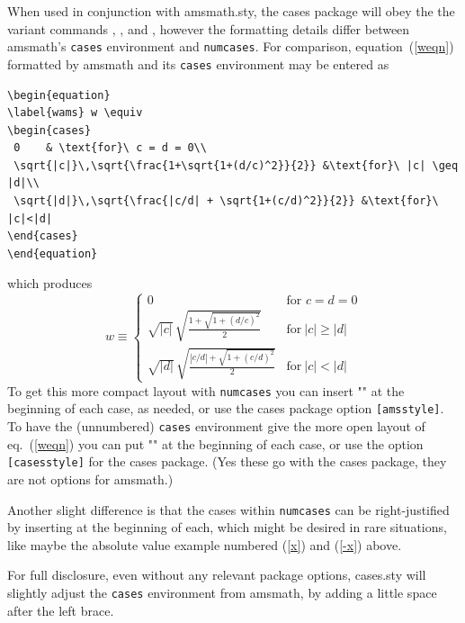 \documentclass[DIV=9, pagesize=auto]{scrartcl}
\newcommand*{\pkg}[1]{\textsf{#1}}
\newcommand*{\cmd}[1]{\texttt{\string#1}}
\newcommand*{\env}[1]{\texttt{#1}}
\newcommand*{\opt}[1]{\texttt{[#1]}}
\begin{document}
When used in conjunction with amsmath.sty, the cases package will obey the the variant 
commands \cmd{\tag}, \cmd{\notag}, and \cmd{\mathmargin}, however the formatting details
differ between \pkg{amsmath}'s \env{cases} environment and \env{numcases}.
For comparison, equation~(\ref{weqn}) formatted by \pkg{amsmath} and its \env{cases} environment
may be  entered as
\begin{flushleft}\small
\begin{verbatim}
\begin{equation}
\label{wams} w \equiv
\begin{cases}
 0    & \text{for}\ c = d = 0\\
 \sqrt{|c|}\,\sqrt{\frac{1+\sqrt{1+(d/c)^2}}{2}} &\text{for}\ |c| \geq |d|\\
 \sqrt{|d|}\,\sqrt{\frac{|c/d| + \sqrt{1+(c/d)^2}}{2}} &\text{for}\ |c|<|d|
\end{cases}
\end{equation}
\end{verbatim}
\end{flushleft}
which produces
\begin{equation}
\label{wams} w\equiv
\begin{cases}
  0    & \text{for }c = d = 0\\
  \sqrt{|c|}\,\sqrt{\frac{1+\sqrt{1+(d/c)^2}}{2}} & \text{for}\ |c| \geq |d| \\
  \sqrt{|d|}\,\sqrt{\frac{|c/d| + \sqrt{1+(c/d)^2}}{2}} & \text{for}\ |c| < |d|
\end{cases}
\end{equation}
To get this more compact layout with \env{numcases} you can insert "\textstyle" 
at the beginning of each case, as needed, or use the \pkg{cases} 
package option \opt{amsstyle}. 
To have  the (unnumbered) \env{cases} environment give the more open layout of
eq.~(\ref{weqn}) you can put "\displaystyle" at the beginning of each case, or use
the option \opt{casesstyle} for the \pkg{cases} package. (Yes these go with the
\pkg{cases} package, they are not options for \pkg{amsmath}.)

Another slight difference is that the cases within \env{numcases} can be right-justified by
inserting \cmd{\hfill} at the beginning of each, which might be desired in rare situations,
like maybe the absolute value example numbered (\ref{x}) and (\ref{-x}) above.

For full disclosure, even without any relevant package options, cases.sty will 
slightly adjust the \env{cases} environment from \pkg{amsmath}, by adding a little
space after the left brace.
\end{document}
